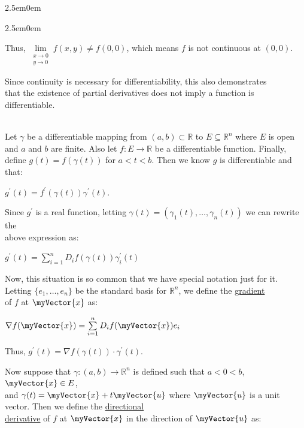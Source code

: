 \documentclass{book}
\newenvironment{myIndent}{%
   \begin{adjustwidth}{2.5em}{0em}%
}{%
   \end{adjustwidth}%
}
\newcommand{\udefine}[1]{{%
   \setulcolor{Red}%
   \setul{0.14em}{0.07em}%
   \ul{#1}%
}}
\newcommand{\mySepTwo}[1][.]{%
   {\noindent\color{#1}{\rule{6.5in}{0.5mm}}}\\%
}
\newcommand{\retTwo}{\hfill\bigbreak}
\newcommand{\mVec}[1]{\myVector{#1}}
\begin{document}
{\begin{myIndent}
{\begin{myIndent}
      Thus, $\lim\limits_{
      \begin{smallmatrix}
         x\rightarrow 0\\ y\rightarrow 0
      \end{smallmatrix}}f(x, y) \neq f(0, 0)$, which means $f$ is not continuous at $(0, 0)$.\retTwo
   \end{myIndent}}

   Since continuity is necessary for differentiability, this also demonstrates\\ that the existence of partial derivatives does not imply a function is\\ differentiable.\retTwo
\end{myIndent}}

\mySepTwo

Let $\gamma$ be a differentiable mapping from $(a, b) \subset \mathbb{R}$ to $E \subseteq \mathbb{R}^n$ where $E$ is open\\ and $a$ and $b$ are finite. Also let $f: E \longrightarrow \mathbb{R}$ be a differentiable function. Finally,\\ define $g(t) = f(\gamma(t))$ for $a < t < b$. Then we know $g$ is differentiable and that:

{\centering $g^\prime(t) = f^\prime(\gamma(t))\gamma^\prime(t)$. \retTwo\par}


Since $g^\prime$ is a real function, letting $\gamma(t) = (\gamma_1(t), \ldots, \gamma_n(t))$ we can rewrite the\\ above expression as:

{\centering $g^\prime(t) = \sum\limits_{i=1}^n D_if(\gamma(t))\gamma^\prime_i(t)$ \retTwo\par}

Now, this situation is so common that we have special notation just for it.\\ Letting $\{e_1, \ldots, e_n\}$ be the standard basis for $\mathbb{R}^n$, we define the \udefine{gradient}\\ of $f$ at $\mVec{x}$ as:

{\centering$\nabla f(\mVec{x}) = \sum\limits_{i=1}^n D_if(\mVec{x})e_i$\retTwo\par}

Thus, $g^\prime(t) = \nabla f(\gamma(t)) \cdot \gamma^\prime(t)$.\retTwo

Now suppose that $\gamma: (a, b) \longrightarrow \mathbb{R}^n$ is defined such that $a < 0 < b$, $\mVec{x} \in E$,\\ and $\gamma(t) = \mVec{x} + t\mVec{u}$ where $\mVec{u}$ is a unit vector. Then we define the \udefine{directional\\ derivative} of $f$ at $\mVec{x}$ in the direction of $\mVec{u}$ as:
\end{document}
